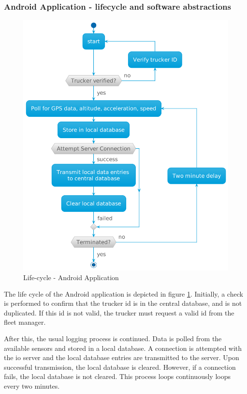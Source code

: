 \subsubsection{Android Application - lifecycle and software abstractions}
\begin{figure}[H]
\centering
\includegraphics[scale=0.4]{../diag/android_activity.png}
\caption{Life-cycle - Android Application}
\label{fig:android_activity}
\end{figure}

The life cycle of the Android application is depicted in figure \ref{fig:android_activity}.
Initially, a check is performed to confirm that the trucker \ac{id} is in the central database, and is not duplicated.
If this \ac{id} is not valid, the trucker must request a valid \ac{id} from the fleet manager.

After this, the usual logging process is continued.
Data is polled from the available sensors and stored in a local database.
A connection is attempted with the \ac{io} server and the local database entries are transmitted to the server.
Upon successful transmission, the local database is cleared.
However, if a connection fails, the local database is not cleared.
This process loops continuously loops every two minutes.
 
